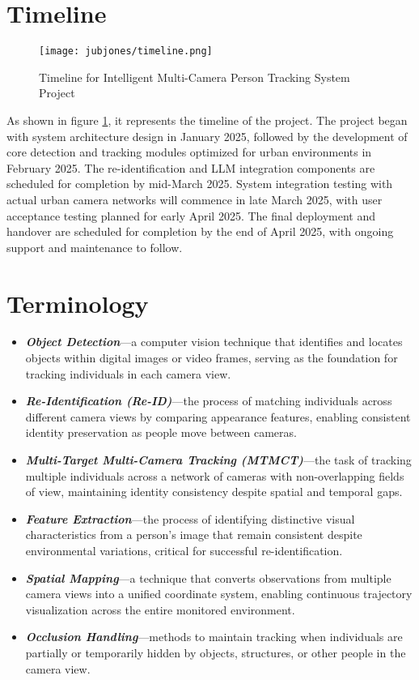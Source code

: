 \section{Timeline}
\label{section:timeline}

\begin{figure}[!htb]
    \centering
    \texttt{[image: jubjones/timeline.png]}
    \caption{Timeline for Intelligent Multi-Camera Person Tracking System Project}
    \label{fig:timeline}
\end{figure}

As shown in figure \ref{fig:timeline}, it represents the timeline of the project.
The project began with system architecture design in January 2025, followed by the development of core detection
and tracking modules optimized for urban environments in February 2025. The re-identification and LLM integration components are scheduled for
completion by mid-March 2025.
System integration testing with actual urban camera networks will commence in late March 2025, with user acceptance testing planned for early April 2025.
The final deployment and handover are scheduled for completion by the end of April 2025, with ongoing support
and maintenance to follow.

\section{Terminology}
\label{section:terminology}

\begin{itemize}[leftmargin=40pt]
    \item \textbf{\textit{Object Detection}}---a computer vision technique that identifies and locates objects within digital images or video frames, serving as the foundation for tracking individuals in each camera view.
    \item \textbf{\textit{Re-Identification (Re-ID)}}---the process of matching individuals across different camera views by comparing appearance features, enabling consistent identity preservation as people move between cameras.
    \item \textbf{\textit{Multi-Target Multi-Camera Tracking (MTMCT)}}---the task of tracking multiple individuals across a network of cameras with non-overlapping fields of view, maintaining identity consistency despite spatial and temporal gaps.
    \item \textbf{\textit{Feature Extraction}}---the process of identifying distinctive visual characteristics from a person's image that remain consistent despite environmental variations, critical for successful re-identification.
    \item \textbf{\textit{Spatial Mapping}}---a technique that converts observations from multiple camera views into a unified coordinate system, enabling continuous trajectory visualization across the entire monitored environment.
    \item \textbf{\textit{Occlusion Handling}}---methods to maintain tracking when individuals are partially or temporarily hidden by objects, structures, or other people in the camera view.
\end{itemize}